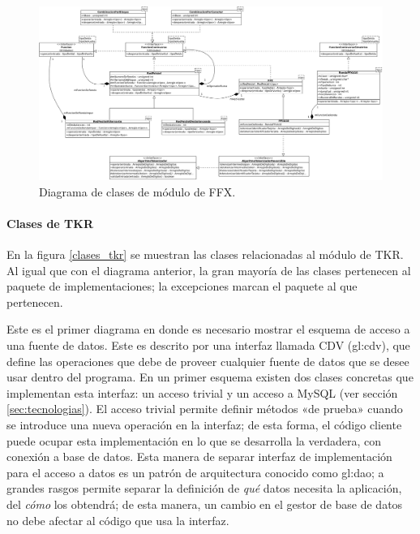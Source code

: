 \begin{figure}
  \begin{center}
    \includegraphics[width=1.0\linewidth]{diagramas/ffx.png}
    \caption{Diagrama de clases de módulo de FFX.}
    \label{clases_ffx}
  \end{center}
\end{figure}

\paragraph{Clases de TKR}

En la figura \ref{clases_tkr} se muestran las clases relacionadas al módulo de
TKR. Al igual que con el diagrama anterior, la gran mayoría de las clases
pertenecen al paquete de implementaciones; la excepciones marcan el paquete al
que pertenecen.

Este es el primer diagrama en donde es necesario mostrar el esquema de acceso a
una fuente de datos. Este es descrito por una interfaz llamada CDV
(\acrlong{gl:cdv}), que define las operaciones que debe de proveer cualquier
fuente de datos que se desee usar dentro del programa. En un primer esquema
existen dos clases concretas que implementan esta interfaz: un acceso trivial y
un acceso a MySQL (ver sección \ref{sec:tecnologias}). El acceso trivial permite
definir métodos «de prueba» cuando se introduce una nueva operación en la
interfaz; de esta forma, el código cliente puede ocupar esta implementación en
lo que se desarrolla la verdadera, con conexión a base de datos. Esta manera de
separar interfaz de implementación para el acceso a datos es un patrón de
arquitectura conocido como \gls{gl:dao}; a grandes rasgos permite separar la
definición de \textit{qué} datos necesita la aplicación, del \textit{cómo} los
obtendrá; de esta manera, un cambio en el gestor de base de datos no debe
afectar al código que usa la interfaz.

